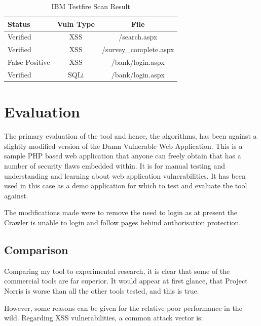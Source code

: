\documentclass[12pt,a4paper]{article}
\begin{document}
\begin{center}
    \begin{table}
        \caption{IBM Testfire Scan Result}
        \begin{center}
            \begin{tabular}{ | l | c | c | }
                \hline
                Status & Vuln Type & File \\ \hline
                Verified & XSS & /search.aspx \\ \hline
                Verified & XSS & /survey\_complete.aspx \\ \hline
                False Positive & XSS & /bank/login.aspx \\ \hline
                Verified & SQLi & /bank/login.aspx \\ 
                \hline
            \end{tabular}
        \end{center}
    \end{table}
\end{center}

\section{Evaluation}
The primary evaluation of the tool and hence, the algorithms, has been against a slightly modified version of the Damn Vulnerable Web Application.  This is a sample PHP based web application that anyone can freely obtain that has a number of security flaws embedded within.  It is for manual testing and understanding and learning about web application vulnerabilities.  It has been used in this case as a demo application for which to test and evaluate the tool against.

The modifications made were to remove the need to login as at present the Crawler is unable to login and follow pages behind authorisation protection.

\subsection{Comparison}
Comparing my tool to experimental research, it is clear that some of the commercial tools are far superior. It would appear at first glance, that Project Norris is worse than all the other tools tested, and this is true. \cite{Suto2010}

However, some reasons can be given for the relative poor performance in the wild. Regarding XSS vulnerabilities, a common attack vector is:
\end{document}
